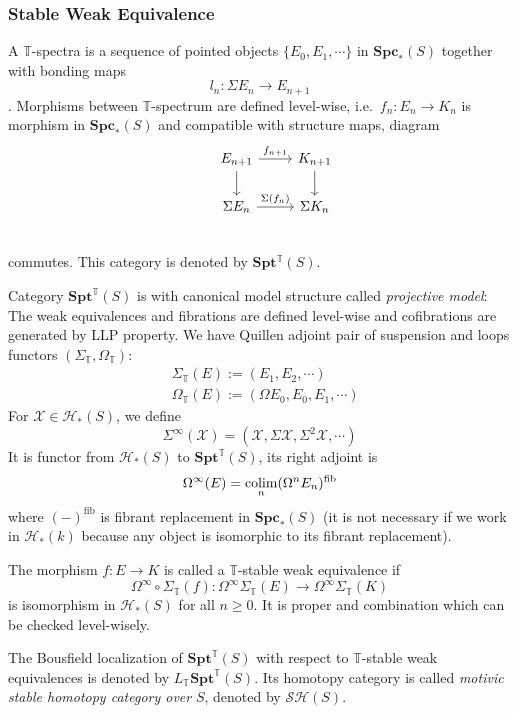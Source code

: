 \documentclass[b5paper,10pt]{article}
\begin{document}
\subsubsection{Stable Weak Equivalence}
\begin{secdefn}
	A $\mathbb{T}$-spectra is a sequence of pointed objects $\{ E_0, E_1 ,\cdots\}$ in $\mathbf{Spc}_*(S)$ together with bonding maps
	\[
	l_n \colon \Sigma E_{n} \to  E_{n+1}
	\].	
	Morphisms between $\mathbb{T}$-spectrum are defined level-wise, i.e.\ $f_n \colon E_n \to K_n$ is morphism in $\mathbf{Spc}_*(S)$ and compatible with structure maps, diagram
	\[
	\begin{tikzcd}
	&E_{n+1} \ar[r,"f_{n+1}"] \ar[d]& K_{n+1} \ar[d]\\
	&\Sigma E_{n} \ar[r,"\Sigma (f_{n})"] & \Sigma K_{n}\\
	\end{tikzcd}
	\]
	commutes.
	 This category is denoted by $\mathbf{Spt^{\mathbb{T}}}(S)$.
\end{secdefn}
Category $\mathbf{Spt^{\mathbb{T}}}(S)$ is with canonical model structure called \emph{projective model}: The weak equivalences and fibrations are defined level-wise and cofibrations are generated by LLP property. We have Quillen adjoint pair of suspension and loops functors $(\Sigma_\mathbb{T}, \Omega_\mathbb{T})$:
\[
\begin{aligned}
&\Sigma_\mathbb{T}(E) := (E_1, E_2 ,\cdots)\\
&\Omega_{\mathbb{T}}(E) := (\Omega E_0, E_0, E_1,\cdots)
\end{aligned}
\]
For $\mathcal{X} \in \mathcal{H}_*(S)$, we define
\[
\Sigma^{\infty}(\mathcal{X}) = (\mathcal{X} , \Sigma \mathcal{X}, \Sigma^2 \mathcal{X}, \cdots)\]
It is functor from $\mathcal{H}_*(S)$ to $\mathbf{Spt}^{\mathbb{T}}(S)$, its right adjoint is 
\[
\Omega^{\infty}(E)= \operatorname*{colim}_n( \Omega^n E_n)^{\text{fib}}
\]
where $(-)^{\text{fib}}$ is fibrant replacement in $\mathbf{Spc}_*(S)$ (it is not necessary if we work in $\mathcal{H}_*(k) $ because any object is isomorphic to its fibrant replacement).
\begin{secdefn}
	The morphism $f \colon E \to K$ is called a $\mathbb{T}$-stable weak equivalence if 
	\[
	\Omega^{\infty}\circ \Sigma_{\mathbb{T}} (f) \colon \Omega^{\infty} \Sigma_{\mathbb{T}}(E) \to \Omega^{\infty} \Sigma_{\mathbb{T}}(K)
	\]
	is isomorphism in $\mathcal{H}_*(S)$ for all $n \geq 0$. It is proper and combination which can be checked level-wisely.
\end{secdefn}
The Bousfield localization of $\mathbf{Spt}^{\mathbb{T}}(S)$ with respect to $\mathbb{T}$-stable weak equivalences is denoted by $L_\mathbb{T} \mathbf{Spt }^{\mathbb{T}}(S)$. Its homotopy category is called \emph{motivic stable homotopy category over} $S$, denoted by $\mathcal{SH}(S)$.
\end{document}
